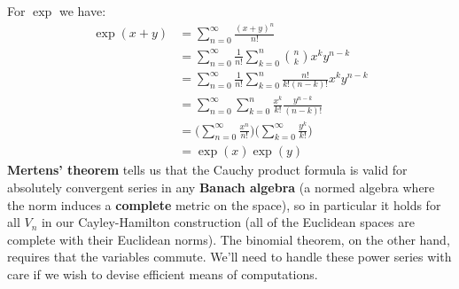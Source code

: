 \documentclass{article}
\theoremstyle{plain}
\theoremstyle{normal}
\begin{document}
            For $\exp$ we have:
            \begin{subequations}
                \begin{align}
                    \exp(x+y)
                    &=\sum_{n=0}^{\infty}\frac{(x+y)^{n}}{n!}\\
                    &=\sum_{n=0}^{\infty}\frac{1}{n!}
                        \sum_{k=0}^{n}\binom{n}{k}x^{k}y^{n-k}\\
                    &=\sum_{n=0}^{\infty}\frac{1}{n!}
                        \sum_{k=0}^{n}\frac{n!}{k!(n-k)!}x^{k}y^{n-k}\\
                    &=\sum_{n=0}^{\infty}\sum_{k=0}^{n}
                        \frac{x^{k}}{k!}\frac{y^{n-k}}{(n-k)!}\\
                    &=\Big(\sum_{n=0}^{\infty}\frac{x^{n}}{n!}\Big)
                        \Big(\sum_{k=0}^{\infty}\frac{y^{k}}{k!}\Big)\\
                    &=\exp(x)\exp(y)
                \end{align}
            \end{subequations}
            \textbf{Mertens' theorem} tells us that the Cauchy product formula
            is valid for absolutely convergent series in any
            \textbf{Banach algebra} (a normed algebra where the norm induces
            a \textbf{complete} metric on the space), so in particular it holds
            for all $V_{n}$ in our Cayley-Hamilton construction
            (all of the Euclidean spaces are complete with their Euclidean
            norms). The binomial theorem, on the other hand, requires that the
            variables commute. We'll need to handle these power series with
            care if we wish to devise efficient means of computations.
\end{document}
